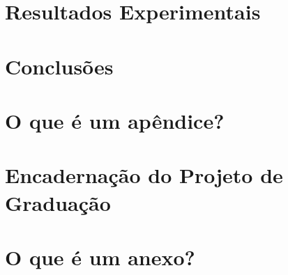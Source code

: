 \documentclass[a4paper,12pt,oneside,openany]{book}
\begin{document}
\chapter{Resultados Experimentais}
\label{cap5}


\chapter{Conclusões}
\label{cap6}


\normalsize
\cleardoublepage
{}



   \appendix
   \chapter{O que é um apêndice?}
   \label{ApendiceA}
   
   \chapter{Encadernação do Projeto de Graduação}
   \label{ApendiceB}
   
   \chapter{O que é um anexo?}
   \label{ApendiceC}
      

\backmatter
\end{document}
